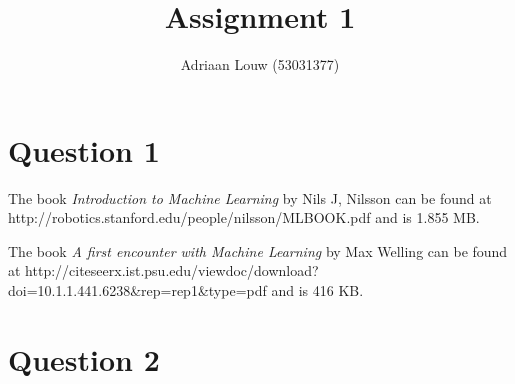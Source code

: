 \documentclass[10pt,a4paper]{article}
\title{Assignment 1}
\author{ Adriaan Louw (53031377)}
\begin{document}
\maketitle

\tableofcontents

\section{Question 1}

The book \emph{Introduction to Machine Learning} by Nils J, Nilsson can be found at
http://robotics.stanford.edu/people/nilsson/MLBOOK.pdf and is 1.855 MB.

The book \emph{A first encounter with Machine Learning} by Max Welling can be found at 
http://citeseerx.ist.psu.edu/viewdoc/download?doi=10.1.1.441.6238&rep=rep1&type=pdf and is 416 KB.

\section{Question 2}



\end{document}
